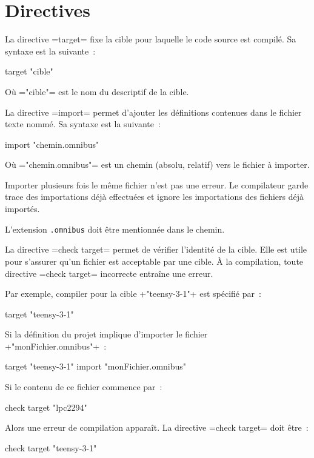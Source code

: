 




\chapter{Directives}



La directive \omnibus=target= fixe la cible pour laquelle le code source est compilé. Sa syntaxe est la suivante~:
\begin{OMNIBUS}
target "cible"
\end{OMNIBUS}
Où \omnibus="cible"= est le nom du descriptif de la cible.







La directive \omnibus=import= permet d'ajouter les définitions contenues dans le fichier texte nommé. Sa syntaxe est la suivante~:
\begin{OMNIBUS}
import "chemin.omnibus"
\end{OMNIBUS}
Où \omnibus="chemin.omnibus"= est un chemin (absolu, relatif) vers le fichier à importer.

Importer plusieurs fois le même fichier n'est pas une erreur. Le compilateur garde trace des importations déjà effectuées et ignore les importations des fichiers déjà importés.

L'extension \texttt{.omnibus} doit être mentionnée dans le chemin.



La directive \omnibus=check target= permet de vérifier l'identité de la cible. Elle est utile pour s'assurer qu'un fichier est acceptable par une cible. À la compilation, toute directive \omnibus=check target= incorrecte entraîne une erreur.

Par exemple, compiler pour la cible \omnibus+"teensy-3-1"+ est spécifié par~:

\begin{OMNIBUS}
target "teensy-3-1"
\end{OMNIBUS}

Si la définition du projet implique d'importer le fichier \omnibus+"monFichier.omnibus"+~:

\begin{OMNIBUS}
target "teensy-3-1"
import "monFichier.omnibus"
\end{OMNIBUS}

Si le contenu de ce fichier commence par~:
\begin{OMNIBUS}
check target "lpc2294"
\end{OMNIBUS}

Alors une erreur de compilation apparaît. La directive \omnibus=check target= doit être~:
\begin{OMNIBUS}
check target "teensy-3-1"
\end{OMNIBUS}

